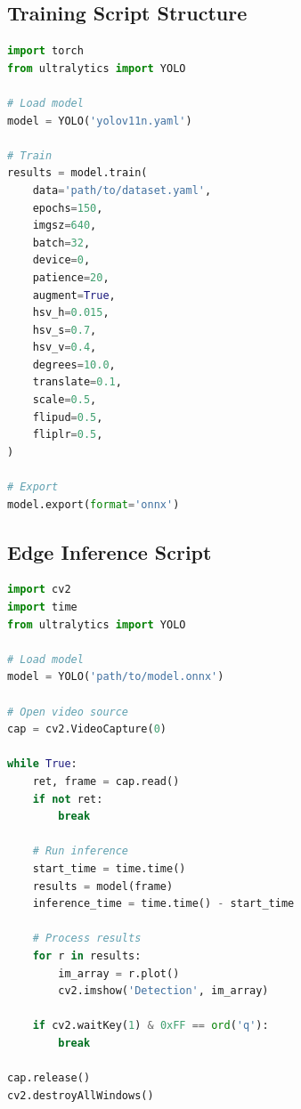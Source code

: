 \documentclass[11pt,a4paper]{article}
\begin{document}
\subsection{Training Script Structure}

\begin{lstlisting}[language=Python]
import torch
from ultralytics import YOLO

# Load model
model = YOLO('yolov11n.yaml')

# Train
results = model.train(
    data='path/to/dataset.yaml',
    epochs=150,
    imgsz=640,
    batch=32,
    device=0,
    patience=20,
    augment=True,
    hsv_h=0.015,
    hsv_s=0.7,
    hsv_v=0.4,
    degrees=10.0,
    translate=0.1,
    scale=0.5,
    flipud=0.5,
    fliplr=0.5,
)

# Export
model.export(format='onnx')
\end{lstlisting}

\subsection{Edge Inference Script}

\begin{lstlisting}[language=Python]
import cv2
import time
from ultralytics import YOLO

# Load model
model = YOLO('path/to/model.onnx')

# Open video source
cap = cv2.VideoCapture(0)

while True:
    ret, frame = cap.read()
    if not ret:
        break
    
    # Run inference
    start_time = time.time()
    results = model(frame)
    inference_time = time.time() - start_time
    
    # Process results
    for r in results:
        im_array = r.plot()
        cv2.imshow('Detection', im_array)
    
    if cv2.waitKey(1) & 0xFF == ord('q'):
        break

cap.release()
cv2.destroyAllWindows()
\end{lstlisting}
\end{document}
